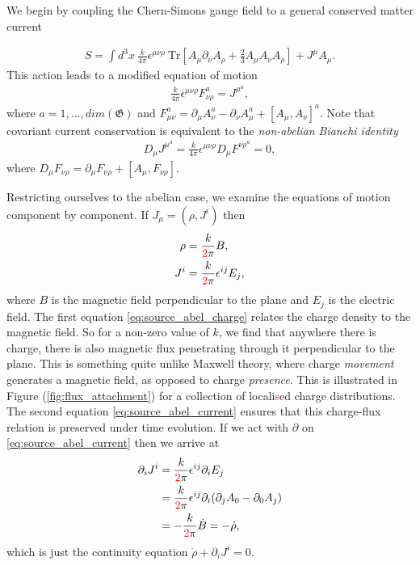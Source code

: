     We begin by coupling the Chern-Simons gauge field to a general conserved matter current


    \begin{align}
        S = \int d^3x \ \frac{k}{4 \pi} \epsilon^{\mu \nu \rho} \ \mathrm{Tr} \left[A_{\mu} \partial_{\nu} A_{\rho}+ \frac{2}{3} A_{\mu} A_{\nu} A_{\rho} \right] + J^{\mu} A_{\mu}.
    \end{align}
    This action leads to a modified equation of motion
    \begin{align}
        \frac{k}{4 \pi} \epsilon^{\mu \nu \rho} F^a_{\nu \rho} = J^{\mu}^a,
    \end{align}
    where $a=1,...,dim(\mathfrak{G})$ and $F_{\mu \nu}^a = \partial_{\mu} A_{\nu}^a - \partial_{\nu} A_{\mu}^a + [A_{\mu}, A_{\nu}]^a$. Note that covariant current conservation is equivalent to the \textit{non-abelian Bianchi identity}
    \begin{align}
        D_{\mu} J^{\mu}^a = \frac{k}{4 \pi} \epsilon^{\mu \nu \rho} D_{\mu} F^{\nu \rho}^a = 0,
    \end{align}
    where $D_{\mu} F_{\nu \rho} = \partial_{\mu} F_{\nu \rho} + [A_{\mu}, F_{\nu \rho}]$.

    Restricting ourselves to the abelian case, we examine the equations of motion component by component. If $J_{\mu} = (\rho, J^i)$ then
    \begin{align}
        \rho  &= \frac{k}{\textcolor{red}{2} \pi} B \label{eq:source_abel_charge} ,\\
        J^i &= \frac{k}{\textcolor{red}{2} \pi} \epsilon^{i j } E_j \label{eq:source_abel_current},
    \end{align}
    where $B$ is the magnetic field perpendicular to the plane and $E_j$ is the electric field. The first equation \eqref{eq:source_abel_charge} relates the charge density to the magnetic field. So for a non-zero value of $k$, we find that anywhere there is charge, there is also magnetic flux penetrating through it perpendicular to the plane. This is something quite unlike Maxwell theory, where charge \textit{movement} generates a magnetic field, as opposed to charge \textit{presence}. This is illustrated in  Figure (\ref{fig:flux_attachment}) for a collection of locali\textcolor{red}{s}ed charge distributions. The second equation \eqref{eq:source_abel_current} ensures that this charge-flux relation is preserved under time evolution. If we act with $\partial$ on \eqref{eq:source_abel_current} then we arrive at
    \begin{align}
        \partial_i J^i &= \frac{k}{\textcolor{red}{2} \pi} \epsilon^{ij} \partial_i E_j\nonumber \\
        &= \frac{k}{\textcolor{red}{2} \pi} \epsilon^{ij} \partial_i ( \partial_j A_0 - \partial_0 A_j) \nonumber \\
        &= -\frac{k}{\textcolor{red}{2} \pi} \dot{B} = -\dot{\rho},
    \end{align}
    which is just the continuity equation $\dot{\rho} + \partial_i J^i=0$.





